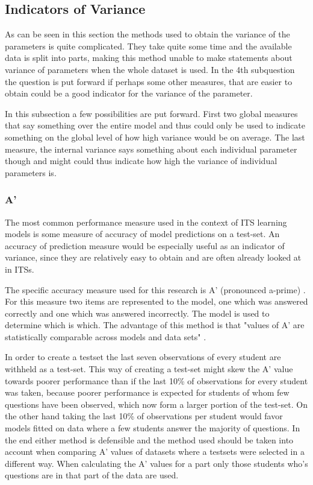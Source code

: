 \documentclass{scrartcl}
\begin{document}
\subsection{Indicators of Variance}
\label{sec:perf}
As can be seen in this section the methods used to obtain the variance of the parameters is quite complicated. They take quite some time and the available data is split into parts, making this method unable to make statements about variance of parameters when the whole dataset is used. In the 4th subquestion the question is put forward if perhaps some other measures, that are easier to obtain could be a good indicator for the variance of the parameter.

In this subsection a few possibilities are put forward. First two global measures that say something over the entire model and thus could only be used to indicate something on the global level of how high variance would be on average. The last measure, the internal variance says something about each individual parameter though and might could thus indicate how high the variance of individual parameters is.

\subsubsection{A'}
The most common performance measure used in the context of ITS learning models is some measure of accuracy of model predictions on a test-set. An accuracy of prediction measure would be especially useful as an indicator of variance, since they are relatively easy to obtain and are often already looked at in ITSs. 

The specific accuracy measure used for this research is A' (pronounced a-prime) \cite{modelreview}. For this measure two items are represented to the model, one which was answered correctly and one which was answered incorrectly. The model is used to determine which is which. The advantage of this method is that "values of A' are statistically comparable across models and data sets" \cite{modelreview}.

In order to create a testset the last seven observations of every student are withheld as a test-set. This way of creating a test-set might skew the A' value towards poorer performance than if the last 10\% of observations for every student was taken, because poorer performance is expected for students of whom few questions have been observed, which now form a larger portion of the test-set. On the other hand taking the last 10\% of observations per student would favor models fitted on data where a few students answer the majority of questions. In the end either method is defensible and the method used should be taken into account when comparing A' values of datasets where a testsets were selected in a different way. When calculating the A' values for a part only those students who's questions are in that part of the data are used.
\end{document}
